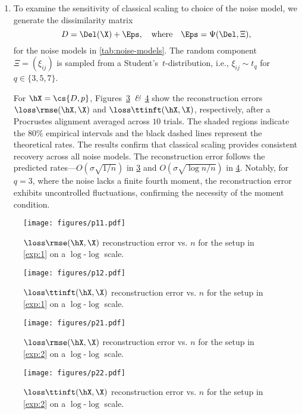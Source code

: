 \documentclass[10pt]{article}
\begin{document}
\begin{enumerate}[label=\textbf{Experiment \arabic*.}, ref=Experiment \arabic*, leftmargin=*, itemindent=8em]
    \item\label{exp:2} 
    To examine the sensitivity of classical scaling to choice of the noise model, we generate the dissimilarity matrix
    \[
    D = \Del(\X) + \Eps, \quad \text{where} \quad \Eps = \Psi(\Del, \Xi),
    \]
    for the noise models in \cref{tab:noise-models}. The random component $\Xi = (\xi_{ij})$ is sampled from a Student's~$t$-distribution, i.e., $\xi_{ij} \sim t_q$ for $q \in \{3, 5, 7\}$. 

    \qquad For $\hX = \cs{D, p}$, Figures~\ref{fig:p21}~\textit{\&}~\ref{fig:p22} show the reconstruction errors $\loss\rmse(\hX, \X)$ and $\loss\ttinft(\hX, \X)$, respectively, after a Procrustes alignment averaged across $10$ trials. The shaded regions indicate the $80\%$ empirical intervals and the black dashed lines represent the theoretical rates. The results confirm that classical scaling provides consistent recovery across all noise models. The reconstruction error follows the predicted rates—$O(\sigma\sqrt{1/n})$ in \cref{fig:p21} and $O(\sigma\sqrt{\log{n}/n})$ in \cref{fig:p22}. Notably, for $q=3$, where the noise lacks a finite fourth moment, the reconstruction error exhibits uncontrolled fluctuations, confirming the necessity of the moment condition.
\end{enumerate}

\begin{figure}
    \centering
    \texttt{[image: figures/p11.pdf]}
    \caption{$\loss\rmse(\hX, \X)$ reconstruction error vs. $n$ for the setup in \ref{exp:1} on a $\log$-$\log$ scale.}
    \label{fig:p11}
\end{figure}


\begin{figure}
    \centering
    \texttt{[image: figures/p12.pdf]}
    \caption{$\loss\ttinft(\hX, \X)$ reconstruction error vs. $n$ for the setup in \ref{exp:1} on a $\log$-$\log$ scale.}
    \label{fig:p12}
\end{figure}

\begin{figure}
    \centering
    \texttt{[image: figures/p21.pdf]}
    \caption{$\loss\rmse(\hX, \X)$ reconstruction error vs. $n$ for the setup in \ref{exp:2} on a $\log$-$\log$ scale.}
    \label{fig:p21}
\end{figure}

\begin{figure}
    \centering
    \texttt{[image: figures/p22.pdf]}
    \caption{$\loss\ttinft(\hX, \X)$ reconstruction error vs. $n$ for the setup in \ref{exp:2} on a $\log$-$\log$ scale.}
    \label{fig:p22}
\end{figure}
\end{document}
